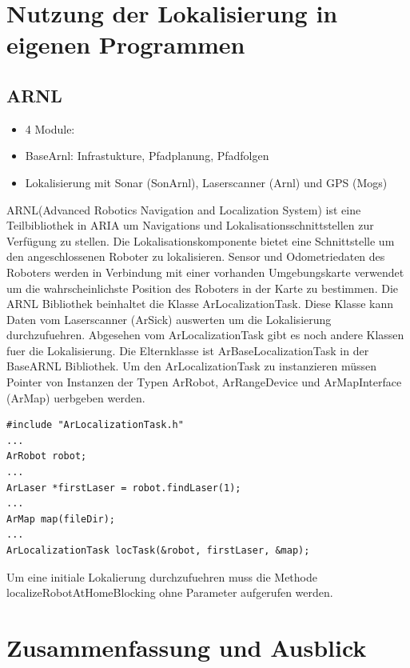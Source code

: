 \documentclass{article}
\begin{document}
\section{Nutzung der Lokalisierung in eigenen Programmen}

\subsection{ARNL}
\begin{itemize}
\item 4 Module:
\item BaseArnl: Infrastukture, Pfadplanung, Pfadfolgen
\item Lokalisierung mit Sonar (SonArnl), Laserscanner (Arnl) und GPS (Mogs)
\end{itemize}
ARNL(Advanced Robotics Navigation and Localization System) ist eine Teilbibliothek in ARIA um Navigations und Lokalisationsschnittstellen zur Verf\"ugung zu stellen. Die Lokalisationskomponente bietet eine Schnittstelle um den angeschlossenen Roboter zu lokalisieren. Sensor und Odometriedaten des Roboters werden in Verbindung mit einer vorhanden Umgebungskarte verwendet um die wahrscheinlichste Position des Roboters in der Karte zu bestimmen. \cite{arnl} 
Die ARNL Bibliothek beinhaltet die Klasse ArLocalizationTask. Diese Klasse kann Daten vom Laserscanner (ArSick) auswerten um die Lokalisierung durchzufuehren. Abgesehen vom ArLocalizationTask gibt es noch andere Klassen fuer die Lokalisierung. Die Elternklasse ist ArBaseLocalizationTask in der BaseARNL Bibliothek. \cite{arnl}
Um den ArLocalizationTask zu instanzieren m\"ussen Pointer von Instanzen der Typen ArRobot, ArRangeDevice und ArMapInterface (ArMap) uerbgeben werden.
\lstset{language=C++}
\begin{lstlisting}
#include "ArLocalizationTask.h"
...
ArRobot robot;
...
ArLaser *firstLaser = robot.findLaser(1);
...
ArMap map(fileDir);
...
ArLocalizationTask locTask(&robot, firstLaser, &map);
\end{lstlisting}
Um eine initiale Lokalierung durchzufuehren muss die Methode localizeRobotAtHomeBlocking ohne Parameter aufgerufen werden.




\section{Zusammenfassung und Ausblick}


\end{document}
